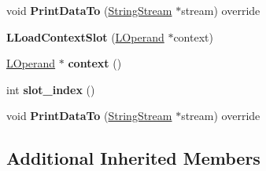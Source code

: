 \begin{DoxyCompactItemize}
\item 
void {\bfseries Print\+Data\+To} (\hyperlink{classv8_1_1internal_1_1_string_stream}{String\+Stream} $\ast$stream) override\hypertarget{classv8_1_1internal_1_1_l_load_context_slot_a3d90d4a2419aa4a491d08638f2c34ae8}{}\label{classv8_1_1internal_1_1_l_load_context_slot_a3d90d4a2419aa4a491d08638f2c34ae8}

\item 
{\bfseries L\+Load\+Context\+Slot} (\hyperlink{classv8_1_1internal_1_1_l_operand}{L\+Operand} $\ast$context)\hypertarget{classv8_1_1internal_1_1_l_load_context_slot_a331a06a5ac26d944904c9e0e0a5c4c7d}{}\label{classv8_1_1internal_1_1_l_load_context_slot_a331a06a5ac26d944904c9e0e0a5c4c7d}

\item 
\hyperlink{classv8_1_1internal_1_1_l_operand}{L\+Operand} $\ast$ {\bfseries context} ()\hypertarget{classv8_1_1internal_1_1_l_load_context_slot_afc22b14bd7160711ef595feb775a3bac}{}\label{classv8_1_1internal_1_1_l_load_context_slot_afc22b14bd7160711ef595feb775a3bac}

\item 
int {\bfseries slot\+\_\+index} ()\hypertarget{classv8_1_1internal_1_1_l_load_context_slot_a1f7e4e29698dd3574bfdbf817c7c19d4}{}\label{classv8_1_1internal_1_1_l_load_context_slot_a1f7e4e29698dd3574bfdbf817c7c19d4}

\item 
void {\bfseries Print\+Data\+To} (\hyperlink{classv8_1_1internal_1_1_string_stream}{String\+Stream} $\ast$stream) override\hypertarget{classv8_1_1internal_1_1_l_load_context_slot_a3d90d4a2419aa4a491d08638f2c34ae8}{}\label{classv8_1_1internal_1_1_l_load_context_slot_a3d90d4a2419aa4a491d08638f2c34ae8}

\end{DoxyCompactItemize}
\subsection*{Additional Inherited Members}


